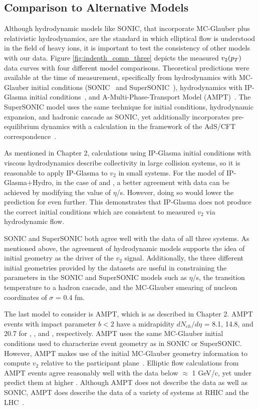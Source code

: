 \subsection{Comparison to Alternative Models}%
Although hydrodynamic models like SONIC, that incorporate MC-Glauber plus relativistic hydrodynamics, are the standard in which elliptical flow is understood in the field of heavy ions, it is important to test the consistency of other models with our data. Figure \ref{fig:indepth_comp_three} depicts the measured $v_2(\mbox{$p_T$})$ data curves with four different model comparisons. Theoretical predictions were available at the time of measurement, specifically from hydrodynamics with MC-Glauber initial conditions (SONIC~\cite{Habich2015} and SuperSONIC~\cite{Romatschke2015}), hydrodynamics with IP-Glasma initial conditions~\cite{Schenke20141039}, and A-Multi-Phase-Transport Model (AMPT)~\cite{PhysRevC.72.064901}. The SuperSONIC model uses the same technique for initial conditions, hydrodynamic expansion, and hadronic cascade as SONIC, yet additionally incorporates pre-equilibrium dynamics with a calculation in the framework of the AdS/CFT correspondence~\cite{PhysRevLett.111.222302}.

As mentioned in Chapter 2, calculations using IP-Glasma initial conditions with viscous hydrodynamics describe collectivity in large collision systems, so it is reasonable to apply IP-Glasma to $v_2$ in small systems. For the model of IP-Glasma+Hydro, in the case of \dau and \hau, a better agreement with data can be achieved by modifying the value of $\eta$/s. However, doing so would lower the prediction for \pau even further. This demonstrates that IP-Glasma does not produce the correct initial conditions which are consistent to measured $v_2$ via hydrodynamic flow.

SONIC and SuperSONIC both agree well with the data of all three systems. As mentioned above, the agreement of hydrodynamic models supports the idea of initial geometry as the driver of the $v_2$ signal. Additionally, the three different initial geometries provided by the datasets are useful in constraining the parameters in the SONIC and SuperSONIC models such as $\eta$/s, the transition temperature to a hadron cascade, and the MC-Glauber smearing of nucleon coordinates of $\sigma$ = 0.4 fm.

The last model to consider is AMPT, which is as described in Chapter 2. AMPT events with impact parameter $b<2$ have a midrapidity $dN_{ch}/d\eta$ = 8.1, 14.8, and 20.7 for \pau, \dau, and \hau, respectively. AMPT uses the same MC-Glauber initial conditions used to characterize event geometry as in SONIC or SuperSONIC. However, AMPT makes use of the initial MC-Glauber geometry information to compute $v_2$ relative to the participant plane~\cite{PhysRevC.92.054903}. Elliptic flow calculations from AMPT events agree reasonably well with the data below \pt $\approx$ 1 GeV/c, yet under predict them at higher \pt. Although AMPT does not describe the data as well as SONIC, AMPT does describe the data of a variety of systems at RHIC and the LHC~\cite{PhysRevC.93.054911}. 

